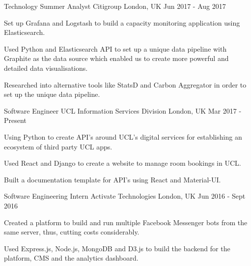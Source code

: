 

\begin{cventries}

\cventry
  {Technology Summer Analyst}
  {Citigroup}
  {London, UK}
  {Jun 2017 - Aug 2017}
  {
  \begin{cvitems}
    \item {Set up Grafana and Logstash to build a capacity monitoring application
    using Elasticsearch.}
    \item {Used Python and Elasticsearch API to set up a unique data pipeline
      with Graphite as the data source which enabled us to create more powerful
      and detailed data visualisations.}
    \item {Researched into alternative tools like StatsD and Carbon Aggregator
      in order to set up the unique data pipeline.}
  \end{cvitems}
  }


\cventry
  {Software Engineer}
  {UCL Information Services Division}
  {London, UK}
  {Mar 2017 - Present}
  {
  \begin{cvitems}
    \item {Using Python to create API's around UCL's digital services for establishing an ecosystem of third party UCL apps.}
    \item {Used React and Django to create a website to manage room bookings in UCL.}
    \item {Built a documentation template for API's using React and Material-UI.}
  \end{cvitems}
  }


\cventry
  {Software Engineering Intern}
  {Activate Technologies}
  {London, UK}
  {Jun 2016 - Sept 2016}
  {
    \begin{cvitems}
      \item {Created a platform to build and run multiple Facebook Messenger
        bots from the same server, thus, cutting costs considerably.}
      \item {Used Express.js, Node.js, MongoDB and D3.js to build the backend
        for the platform, CMS and the analytics dashboard.}
    \end{cvitems}
  }


\end{cventries}
